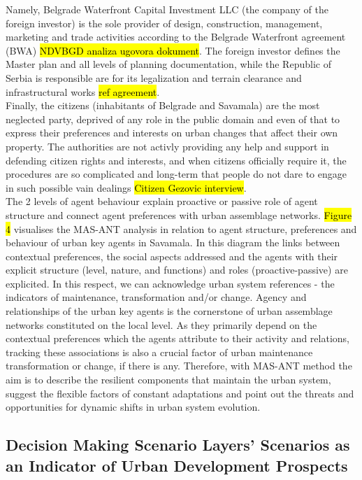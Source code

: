 \documentclass[11pt]{report}
\begin{document}
Namely, Belgrade Waterfront Capital Investment LLC (the company of the foreign investor) is the sole provider of design, construction, management, marketing and trade activities according to the Belgrade Waterfront agreement (BWA) \hl{NDVBGD analiza ugovora dokument}.
The foreign investor defines the Master plan and all levels of planning documentation, while the Republic of Serbia is responsible are for its legalization and terrain clearance and infrastructural works \hl{ref agreement}.
\\
Finally, the citizens (inhabitants of Belgrade and Savamala) are the most neglected party, deprived of any role in the public domain and even of that to express their preferences and interests on urban changes that affect their own property. 
The authorities are not activly providing any help and support in defending citizen rights and interests, and when citizens officially require it, the procedures are so complicated and long-term that people do not dare to engage in such possible vain dealings \hl{Citizen Gezovic interview}. 
\\
The 2 levels of agent behaviour explain proactive or passive role of agent structure and connect agent preferences with urban assemblage networks.
\hl{Figure 4} visualises the MAS-ANT analysis in relation to agent structure, preferences and behaviour of urban key agents in Savamala. In this diagram the links between contextual preferences, the social aspects addressed and the agents with their explicit structure (level, nature, and functions) and roles (proactive-passive) are explicited.
In this respect, we can acknowledge urban system references - the indicators of maintenance, transformation and/or change.
Agency and relationships of the urban key agents is the cornerstone of urban assemblage networks constituted on the local level. As they primarily depend on the contextual preferences which the agents attribute to their activity and relations, tracking these associations is also a crucial factor of urban maintenance transformation or change, if there is any.
Therefore, with MAS-ANT method the aim is to describe the resilient components that maintain the urban system, suggest the flexible factors of constant adaptations and point out the threats and opportunities for dynamic shifts in urban system evolution.



\subsection{Decision Making Scenario Layers' Scenarios as an Indicator of Urban Development Prospects}
\end{document}
